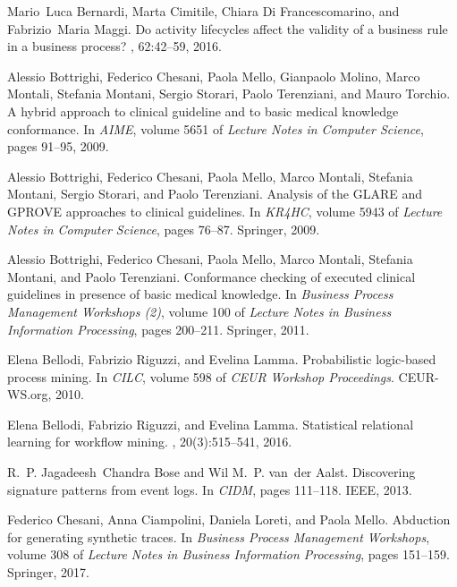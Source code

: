 \documentclass[a4wide,11pt]{article}
\theoremstyle{definition}
\theoremstyle{plain}
\begin{document}
\begin{thebibliography}{MWvdAvdB06}
Mario~Luca Bernardi, Marta Cimitile, Chiara {Di Francescomarino}, and
  Fabrizio~Maria Maggi.
\newblock Do activity lifecycles affect the validity of a business rule in a
  business process?
, 62:42--59, 2016.

Alessio Bottrighi, Federico Chesani, Paola Mello, Gianpaolo Molino, Marco
  Montali, Stefania Montani, Sergio Storari, Paolo Terenziani, and Mauro
  Torchio.
\newblock A hybrid approach to clinical guideline and to basic medical
  knowledge conformance.
\newblock In {\em {AIME}}, volume 5651 of {\em Lecture Notes in Computer
  Science}, pages 91--95, 2009.

Alessio Bottrighi, Federico Chesani, Paola Mello, Marco Montali, Stefania
  Montani, Sergio Storari, and Paolo Terenziani.
\newblock Analysis of the {GLARE} and {GPROVE} approaches to clinical
  guidelines.
\newblock In {\em {KR4HC}}, volume 5943 of {\em Lecture Notes in Computer
  Science}, pages 76--87. Springer, 2009.

Alessio Bottrighi, Federico Chesani, Paola Mello, Marco Montali, Stefania
  Montani, and Paolo Terenziani.
\newblock Conformance checking of executed clinical guidelines in presence of
  basic medical knowledge.
\newblock In {\em Business Process Management Workshops {(2)}}, volume 100 of
  {\em Lecture Notes in Business Information Processing}, pages 200--211.
  Springer, 2011.

Elena Bellodi, Fabrizio Riguzzi, and Evelina Lamma.
\newblock Probabilistic logic-based process mining.
\newblock In {\em {CILC}}, volume 598 of {\em {CEUR} Workshop Proceedings}.
  CEUR-WS.org, 2010.

Elena Bellodi, Fabrizio Riguzzi, and Evelina Lamma.
\newblock Statistical relational learning for workflow mining.
, 20(3):515--541, 2016.

R.~P. Jagadeesh~Chandra Bose and Wil M.~P. van~der Aalst.
\newblock Discovering signature patterns from event logs.
\newblock In {\em {CIDM}}, pages 111--118. {IEEE}, 2013.

Federico Chesani, Anna Ciampolini, Daniela Loreti, and Paola Mello.
\newblock Abduction for generating synthetic traces.
\newblock In {\em Business Process Management Workshops}, volume 308 of {\em
  Lecture Notes in Business Information Processing}, pages 151--159. Springer,
  2017.


\end{thebibliography}
\end{document}
